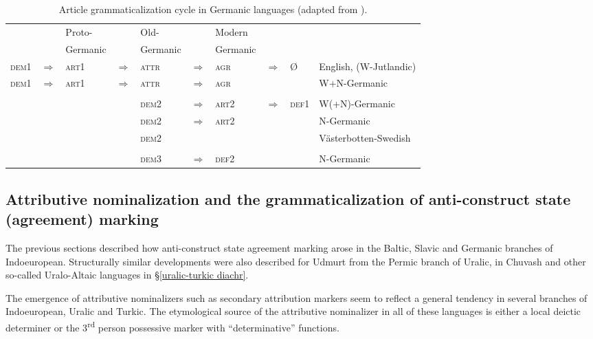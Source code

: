 {\begin{landscape}%
\begin{table}
\begin{center}
\begin{footnotesize}
\begin{tabular}[t]{l l l l l l l l l l}
\hline
\hline
&	&Proto-& &Old-&	&Modern&&\\
&	&Germanic&	&Germanic&	&Germanic&&\\
\hline							
\textsc{dem1}&$\Rightarrow$&\textsc{art1}&$\Rightarrow$&\textsc{attr}&$\Rightarrow$&\textsc{agr}&$\Rightarrow$&Ø&English, (W-Jutlandic)\\
\textsc{dem1}&$\Rightarrow$&\textsc{art1}&$\Rightarrow$&\textsc{attr}&$\Rightarrow$&\textsc{agr}&&&W+N-Germanic\\
\\
&&&		&\textsc{dem2}&$\Rightarrow$&\textsc{art2}&$\Rightarrow$&\textsc{def1}&W(+N)-Germanic\\
&&&		&\textsc{dem2}&$\Rightarrow$&\textsc{art2}&&&N-Germanic\\
&&&		&\textsc{dem2}&&&&&Västerbotten-Swedish\\
\\
&&&		&\textsc{dem3}&$\Rightarrow$&\textsc{def2}&&&N-Germanic\\
\hline
\hline
\end{tabular}
\end{footnotesize}
\end{center}
\caption[Article grammaticalization cycle in Germanic]{Article grammaticalization cycle in Germanic languages (adapted from \citealt[272]{riesler2006a}).}
\end{table}
\end{landscape}

\subsection[Attributive nominalization and anti-construct state]{Attributive nominalization and the grammaticalization of anti-construct state (agreement) marking}
The previous sections described how anti-construct state agreement marking arose in the Baltic, Slavic and Germanic branches of Indoeuropean. Structurally similar developments were also described for Udmurt from the Permic branch of Uralic, in Chuvash and other so-called Uralo-Altaic languages in \S\ref{uralic-turkic diachr}. 

The emergence of attributive nominalizers such as secondary attribution markers seem to reflect a general tendency in several branches of Indoeuropean, Uralic and Turkic. The etymological source of the attributive nominalizer in all of these languages is either a local deictic determiner or the 3\textsuperscript{rd} person possessive marker with “determinative” functions.

}

